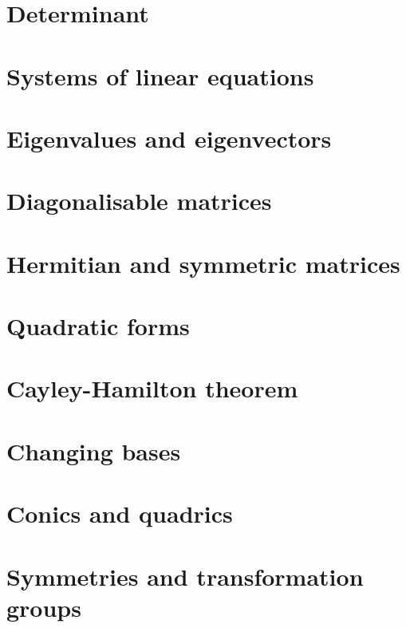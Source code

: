 \documentclass{article}
\begin{document}
\section{Determinant}

\section{Systems of linear equations}

\section{Eigenvalues and eigenvectors}

\section{Diagonalisable matrices}

\section{Hermitian and symmetric matrices}

\section{Quadratic forms}

\section{Cayley-Hamilton theorem}

\section{Changing bases}

\section{Conics and quadrics}

\section{Symmetries and transformation groups}

\end{document}
